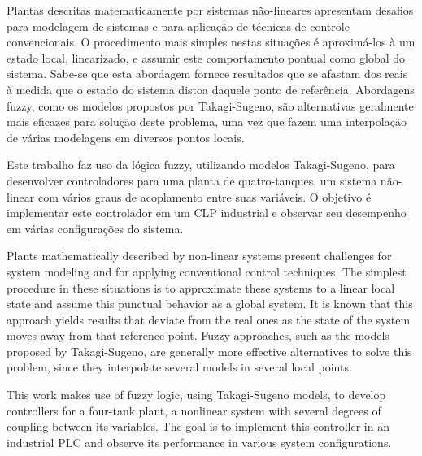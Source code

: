 %
{
	\indent Plantas descritas matematicamente por sistemas não-lineares apresentam desafios para modelagem de sistemas e para aplicação de técnicas de controle convencionais. O procedimento mais simples nestas situações é aproximá-los à um estado local, linearizado, e assumir este comportamento pontual como global do sistema. Sabe-se que esta abordagem fornece resultados que se afastam dos reais à medida que o estado do sistema distoa daquele ponto de referência. Abordagens fuzzy, como os modelos propostos por Takagi-Sugeno, são alternativas geralmente mais eficazes para solução deste problema, uma vez que fazem uma interpolação de várias modelagens em diversos pontos locais.
	
	Este trabalho faz uso da lógica fuzzy, utilizando modelos Takagi-Sugeno, para desenvolver controladores para uma planta de quatro-tanques, um sistema não-linear com vários graus de acoplamento entre suas variáveis. O objetivo é implementar este controlador em um CLP industrial e observar seu desempenho em várias configurações do sistema.
}
\vspace*{2cm}
{
	\indent Plants mathematically described by non-linear systems present challenges for system modeling and for applying conventional control techniques. The simplest procedure in these situations is to approximate these systems to a linear local state and assume this punctual behavior as a global system. It is known that this approach yields results that deviate from the real ones as the state of the system moves away from that reference point. Fuzzy approaches, such as the models proposed by Takagi-Sugeno, are generally more effective alternatives to solve this problem, since they interpolate several models in several local points.
	
	This work makes use of fuzzy logic, using Takagi-Sugeno models, to develop controllers for a four-tank plant, a nonlinear system with several degrees of coupling between its variables. The goal is to implement this controller in an industrial PLC and observe its performance in various system configurations.
}%


